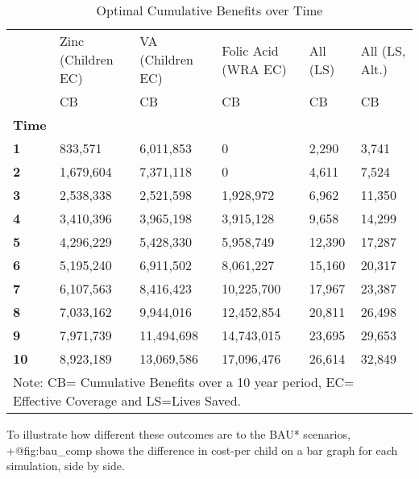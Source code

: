 \documentclass[
]{article}
\begin{document}
\begin{table}
\centering
\caption{Optimal Cumulative Benefits over Time}
\label{tbl:opt_time}
\begin{tabular}{llllll}
\toprule
{} & Zinc (Children EC) & VA (Children EC) & Folic Acid (WRA EC) & All (LS) & All (LS, Alt.) \\
{} &                 CB &               CB &                  CB &       CB &             CB \\
\textbf{Time} &                    &                  &                     &          &                \\
\midrule
\textbf{1   } &            833,571 &        6,011,853 &                   0 &    2,290 &          3,741 \\
\textbf{2   } &          1,679,604 &        7,371,118 &                   0 &    4,611 &          7,524 \\
\textbf{3   } &          2,538,338 &        2,521,598 &           1,928,972 &    6,962 &         11,350 \\
\textbf{4   } &          3,410,396 &        3,965,198 &           3,915,128 &    9,658 &         14,299 \\
\textbf{5   } &          4,296,229 &        5,428,330 &           5,958,749 &   12,390 &         17,287 \\
\textbf{6   } &          5,195,240 &        6,911,502 &           8,061,227 &   15,160 &         20,317 \\
\textbf{7   } &          6,107,563 &        8,416,423 &          10,225,700 &   17,967 &         23,387 \\
\textbf{8   } &          7,033,162 &        9,944,016 &          12,452,854 &   20,811 &         26,498 \\
\textbf{9   } &          7,971,739 &       11,494,698 &          14,743,015 &   23,695 &         29,653 \\
\textbf{10  } &          8,923,189 &       13,069,586 &          17,096,476 &   26,614 &         32,849 \\
\bottomrule
\multicolumn{6}{p{.8\textwidth}}{Note: CB= Cumulative Benefits over a 10 year period, EC= Effective Coverage and LS=Lives Saved. }
\end{tabular}
\end{table}

To illustrate how different these outcomes are to the BAU* scenarios,
+@fig:bau\_comp shows the difference in cost-per child on a bar graph
for each simulation, side by side.
\end{document}
